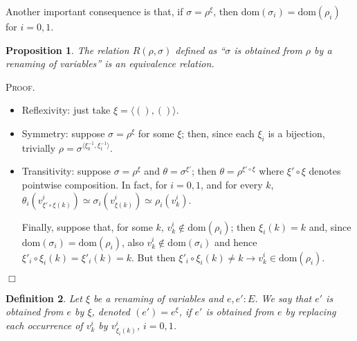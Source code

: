 \documentclass{article}
\newtheorem{definition}{Definition}[section]
\newtheorem{proposition}[definition]{Proposition}
\newenvironment{proof}{\smallskip\textsc{Proof.}}{\hspace*{\fill}$\Box$}
\newcommand{\dom}{\ensuremath{\mathrm{dom}}}
\newcommand{\renamevar}[2]{\ensuremath{{#1}^{#2}}}
\newcommand{\isrenamevar}[3]{\ensuremath{{#1}=\renamevar{#2}{#3}}}
\newcommand{\idn}{()}
\begin{document}
Another important consequence is that, if {\isrenamevar\sigma\rho\xi},
then $\dom(\sigma_i)=\dom(\rho_i)$ for $i=0,1$.
\begin{proposition}\label{renamevarsequiv}
The relation $R(\rho,\sigma)$ defined as ``$\sigma$ is obtained from $\rho$
by a renaming of variables'' is an equivalence relation.
\end{proposition}
\begin{proof}
\begin{itemize}
\item Reflexivity: just take $\xi=\langle\idn,\idn\rangle$.
\item Symmetry: suppose {\isrenamevar\sigma\rho\xi} for some $\xi$; then,
since each $\xi_i$ is a bijection, trivially
{\isrenamevar\rho\sigma{\langle\xi^{-1}_0,\xi^{-1}_1\rangle}}.
\item Transitivity: suppose {\isrenamevar\sigma\rho\xi} and
{\isrenamevar\theta\sigma{\xi'}}; then {\isrenamevar\theta\rho{\xi'\circ\xi}}
where $\xi'\circ\xi$ denotes pointwise composition.  In fact, for $i=0,1$,
and for every $k$, $\theta_i\left(v^i_{\xi'\circ\xi(k)}\right)\simeq%
\sigma_i\left(v^i_{\xi(k)}\right)\simeq\rho_i(v^i_k)$.

Finally, suppose that, for some $k$, $v^i_k\not\in\dom(\rho_i)$; then
$\xi_i(k)=k$ and, since $\dom(\sigma_i)=\dom(\rho_i)$, also
$v^i_k\not\in\dom(\sigma_i)$ and hence $\xi'_i\circ\xi_i(k)=\xi'_i(k)=k$.
But then $\xi'_i\circ\xi_i(k)\neq k\rightarrow v^i_k\in\dom(\rho_i)$.
\end{itemize}
\end{proof}

\begin{definition}
Let $\xi$ be a renaming of variables and $e,e':E$.  We say that $e'$
is obtained from $e$ by $\xi$, denoted {\isrenamevar{(e')}e\xi}, if $e'$
is obtained from $e$ by replacing each occurrence of $v^i_k$ by
$v^i_{\xi_i(k)}$, $i=0,1$.
\end{definition}
\end{document}
